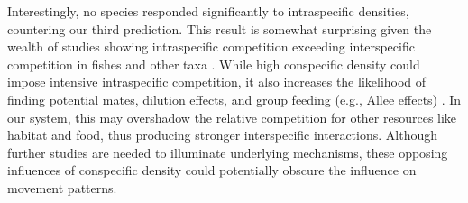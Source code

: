 \documentclass[11pt, class=article, crop=false]{standalone}
\begin{document}
Interestingly, no species responded significantly to intraspecific densities, countering our third prediction. This result is somewhat surprising given the wealth of studies showing intraspecific competition exceeding interspecific competition in fishes \citep{websterMechanismsIndividualConsequences2000, wardIntraspecificFoodCompetition2006} and other taxa \citep{adlerCompetitionCoexistencePlant2018, barabasEffectIntraInterspecific2016, thompsonProcessbasedMetacommunityFramework2020, chessonRolesHarshFluctuating1997, tilmanResourceCompetitionCommunity1982, mcpeekIntraspecificDensityDependence2012}. While high conspecific density could impose intensive intraspecific competition, it also increases the likelihood of finding potential mates, dilution effects, and group feeding (e.g., Allee effects) \citep{courchampAlleeEffectsEcology2008, gascoigneAlleeEffectsDriven2004, teruiCrypticAlleeEffect2015}. In our system, this may overshadow the relative competition for other resources like habitat and food, thus producing stronger interspecific interactions. Although further studies are needed to illuminate underlying mechanisms, these opposing influences of conspecific density could potentially obscure the influence on movement patterns. 
\end{document}
